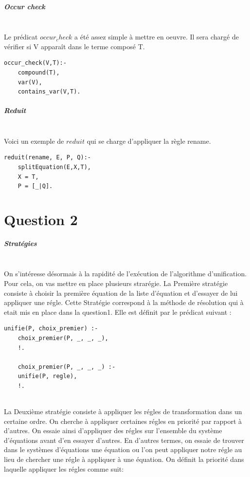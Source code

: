 \documentclass[10pt,a4paper]{report}
\begin{document}
\paragraph{Occur check} ~\\
Le prédicat $occur_check$ a été assez simple à mettre en oeuvre. Il sera chargé de vérifier si V apparaît dans le terme composé T.
\begin{lstlisting}[caption ={occur\_check dans $main.pl$}]
occur_check(V,T):-
	compound(T),
	var(V),
	contains_var(V,T).
\end{lstlisting}

\paragraph{Reduit} ~\\
Voici un exemple de $reduit$ qui se charge d'appliquer la règle rename.
\begin{lstlisting}[caption ={reduit dans $main.pl$}]
reduit(rename, E, P, Q):-
	splitEquation(E,X,T),
	X = T,
	P = [_|Q].
\end{lstlisting}





\chapter*{Question 2}
\paragraph{Stratégies} ~\\
On s'intéresse désormais à la rapidité de l'exécution de l'algorithme d'unification.
Pour cela, on vas mettre en place plusieurs strarégie.
\newline
La Première stratégie consiste à choisir la première équation de la liste d'équation et d'essayer de lui appliquer une régle. Cette Stratégie correspond à la méthode de résolution qui à etait mis en place dans la question1. Elle est définit par le prédicat suivant :
\begin{lstlisting}[caption ={Stratégie choix premier dans $main.pl$}]
% unification choix premier
unifie(P, choix_premier) :- 
	choix_premier(P, _, _, _),
	!.
	
	choix_premier(P, _, _, _) :- 
	unifie(P, regle),
	!.
\end{lstlisting} ~\\

La Deuxième stratégie consiste à appliquer les régles de transformation dans un certaine ordre. On cherche à appliquer certaines régles en priorité par rapport à d'autres. On essaie ainsi d'appliquer des régles sur l'ensemble du système d'équations avant d'en essayer d'autres. En d'autres termes, on essaie de trouver dans le systèmes d'équations une équation ou l'on peut appliquer notre régle au lieu de chercher une régle à appliquer à une équation.
\newline
On définit la priorité dans laquelle appliquer les régles comme suit:
\end{document}
